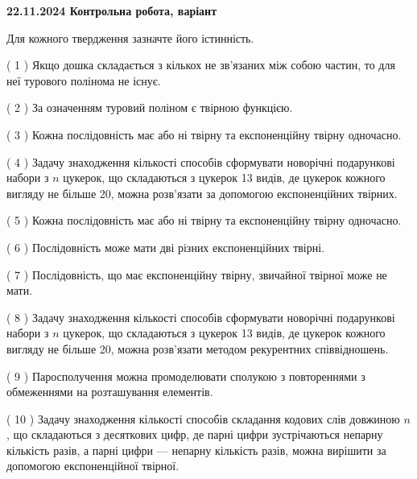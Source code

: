 \documentclass[12pt, ukrainian]{article}
\begin{document}
\vspace{4mm}
\newpage
\begin {large}

\textbf{22.11.2024 Контрольна робота, варіант  }\par


{
Для кожного твердження зазначте його істинність.\par
\vspace{2mm}
( 1 ) Якщо дошка складається з кількох не зв’язаних між собою частин, то для неї турового полінома не існує.%

( 2 ) За означенням туровий поліном є твірною функцією.%

( 3 ) Кожна послідовність має або ні твірну та експоненційну твірну одночасно.%

( 4 ) Задачу знаходження кількості способів сформувати новорічні подарункові набори з $n$ цукерок, що складаються з цукерок 13 видів, де цукерок кожного вигляду не більше 20, можна розв’язати за допомогою експоненційних твірних.%

( 5 ) Кожна послідовність має або ні твірну та експоненційну твірну одночасно.%

( 6 ) Послідовність може мати дві різних експоненційних твірні.%

( 7 ) Послідовність, що має експоненційну твірну, звичайної твірної може не мати.%

( 8 ) Задачу знаходження кількості способів сформувати новорічні подарункові набори з $n$ цукерок, що складаються з цукерок 13 видів, де цукерок кожного вигляду не більше 20, можна розв’язати методом рекурентних співвідношень.%

( 9 ) Паросполучення можна промоделювати сполукою з повтореннями з обмеженнями на розташування елементів.%

( 10 ) Задачу знаходження кількості способів складання кодових слів довжиною $n$, що складаються з десяткових цифр, де парні цифри зустрічаються непарну кількість разів, а парні цифри — непарну кількість разів, можна вирішити за допомогою експоненційної твірної.%


\vspace{5mm}
}
\end {large}
\end{document}
